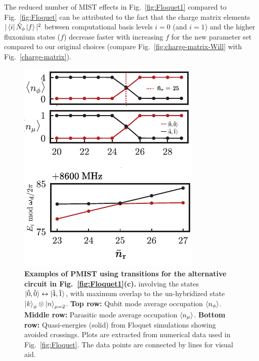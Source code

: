 \documentclass[%
reprint,
superscriptaddress,
 amsmath,amssymb,
 aps,
 prx,
longbibliography,
floatfix,
]{revtex4-2}
\begin{document}
The reduced number of MIST effects in Fig.~\ref{fig:Floquet1} compared to Fig.~\ref{fig:Floquet} can be attributed to the fact that the charge matrix elements 
$|\bra{i}\hat N_\phi\ket{f}|^2$ between computational basis levels $i=0$ (and $i=1$) and the higher fluxonium states ($f$)
decrease faster with increasing $f$ for the new parameter set compared to our original choices (compare Fig.~\ref{fig:charge-matrix-Will} with Fig.~\ref{charge-matrix}). %
\begin{figure}[htb]
    \centering
    \includegraphics[width=\linewidth]{Supp_Fig/Floquet_Will_landscape.pdf}
    \caption{{\bf Examples of PMIST using transitions for the alternative circuit in Fig.~\ref{fig:Floquet1}(c).} involving the states $\ket{\tilde{0},\tilde{0}}\leftrightarrow\ket{\tilde{4},\tilde{1}}$, with maximum overlap to the un-hybridized state $\ket{k}_\phi\otimes\ket{n}_{\mu=2}$. \textbf{Top row:} Qubit mode average occupation $\braket{n_\phi}$. \textbf{Middle row:} Parasitic mode average occupation $\braket{n_\mu}$. \textbf{Bottom row:} Quasi-energies (solid) from Floquet simulations showing avoided crossings. Plots are extracted from numerical data used in Fig.~\ref{fig:Floquet}. The data points are connected by lines for visual aid.}
    \label{fig:011_Will}
\end{figure}
\end{document}
